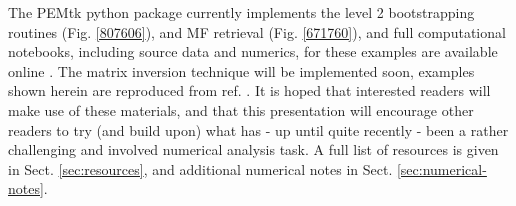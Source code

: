 \documentclass[10pt]{article}
\begin{document}
The PEMtk python package \cite{hockett2021PEMtkDocs, hockett2021PEMtkGithub} currently implements the level 2 bootstrapping routines (Fig. \ref{807606}), and MF retrieval (Fig. \ref{671760}), and full computational notebooks, including source data and numerics, for these examples are available online \cite{hockett2022MFreconFigshare}. The matrix inversion technique will be implemented soon, examples shown herein are reproduced from ref. \cite{gregory2021MolecularFramePhotoelectron}. It is hoped that interested readers will make use of these materials, and that this presentation will encourage other readers to try (and build upon) what has - up until quite recently - been a rather challenging and involved numerical analysis task. A full list of resources is given in Sect. \ref{sec:resources}, and additional numerical notes in Sect. \ref{sec:numerical-notes}.
\end{document}
